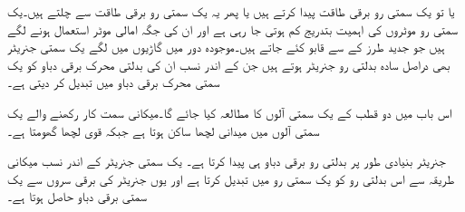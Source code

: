  یا تو یک سمتی رو برقی طاقت پیدا کرتے ہیں یا پھر یہ یک سمتی رو برقی طاقت سے چلتے ہیں۔یک سمتی رو موٹروں کی اہمیت بتدریج کم ہوتی جا رہی ہے اور ان کی جگہ امالی موٹر استعمال ہونے لگے ہیں جو جدید طرز کے  سے قابو کئے جاتے ہیں۔موجودہ دور میں گاڑیوں میں لگے یک سمتی جنریٹر بھی دراصل سادہ بدلتی رو جنریٹر ہوتے ہیں جن کے اندر نسب  ان کی بدلتی محرک برقی دباو کو یک سمتی محرک برقی دباو میں تبدیل کر دیتی ہے۔

اس باب میں دو قطب کے یک سمتی آلوں کا مطالعہ کیا جائے گا۔میکانی سمت کار رکھنے والے یک سمتی آلوں میں میدانی لچھا ساکن ہوتا ہے جبکہ قوی لچھا گھومتا ہے۔

جنریٹر بنیادی طور پر بدلتی رو برقی دباو ہی پیدا کرتا ہے۔ یک سمتی جنریٹر کے اندر نسب   میکانی طریقہ سے اس بدلتی رو کو یک سمتی رو میں تبدیل کرتا ہے اور یوں جنریٹر کی برقی سروں سے یک سمتی برقی دباو حاصل ہوتا ہے۔

